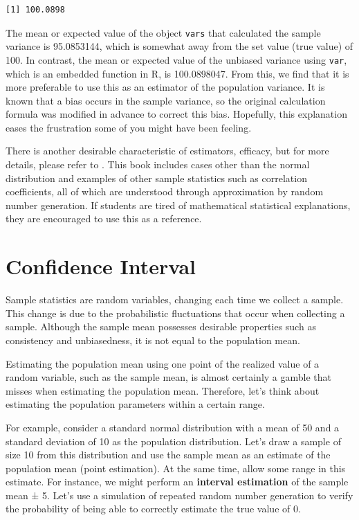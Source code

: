 \documentclass[
  a4paper,
]{book}
\begin{document}
\begin{verbatim}
[1] 100.0898
\end{verbatim}

The mean or expected value of the object \texttt{vars} that calculated
the sample variance is 95.0853144, which is somewhat away from the set
value (true value) of 100. In contrast, the mean or expected value of
the unbiased variance using \texttt{var}, which is an embedded function
in R, is 100.0898047. From this, we find that it is more preferable to
use this as an estimator of the population variance. It is known that a
bias occurs in the sample variance, so the original calculation formula
was modified in advance to correct this bias. Hopefully, this
explanation eases the frustration some of you might have been feeling.

There is another desirable characteristic of estimators, efficacy, but
for more details, please refer to \textcite{kosugi2023}. This book
includes cases other than the normal distribution and examples of other
sample statistics such as correlation coefficients, all of which are
understood through approximation by random number generation. If
students are tired of mathematical statistical explanations, they are
encouraged to use this as a reference.

\section{Confidence Interval}\label{confidence-interval}

Sample statistics are random variables, changing each time we collect a
sample. This change is due to the probabilistic fluctuations that occur
when collecting a sample. Although the sample mean possesses desirable
properties such as consistency and unbiasedness, it is not equal to the
population mean.

Estimating the population mean using one point of the realized value of
a random variable, such as the sample mean, is almost certainly a gamble
that misses when estimating the population mean. Therefore, let's think
about estimating the population parameters within a certain range.

For example, consider a standard normal distribution with a mean of 50
and a standard deviation of 10 as the population distribution. Let's
draw a sample of size 10 from this distribution and use the sample mean
as an estimate of the population mean (point estimation). At the same
time, allow some range in this estimate. For instance, we might perform
an \textbf{interval estimation} of the sample mean ± 5. Let's use a
simulation of repeated random number generation to verify the
probability of being able to correctly estimate the true value of \(0\).
\end{document}
